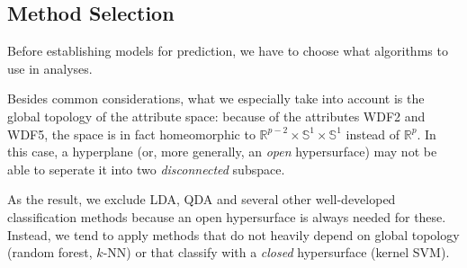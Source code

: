 \subsection{Method Selection}

Before establishing models for prediction, we have to choose what algorithms to use in analyses.

Besides common considerations, what we especially take into account is the global topology of the attribute space: because of the attributes WDF2 and WDF5, the space is in fact homeomorphic to $\mathbb R^{p-2}\times \mathbb S^1\times\mathbb S^1$ instead of $\mathbb R^p$. In this case, a hyperplane (or, more generally, an \emph{open} hypersurface) may not be able to seperate it into two \emph{disconnected} subspace.

As the result, we exclude LDA, QDA and several other well-developed classification methods because an open hypersurface is always needed for these. Instead, we tend to apply methods that do not heavily depend on global topology (random forest, $k$-NN) or that classify with a \emph{closed} hypersurface (kernel SVM).